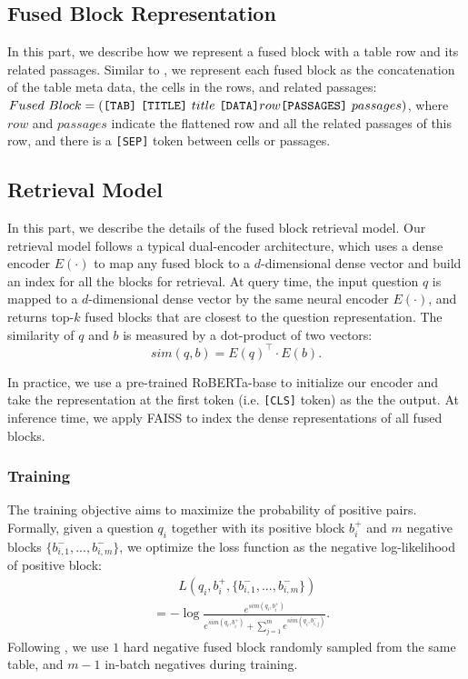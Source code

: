 \documentclass[11pt]{article}
\begin{document}
\subsection{Fused Block Representation}
In this part, we describe how we represent a fused block with a table row and its related passages. Similar to \citet{chen2020open}, we represent each fused block as the concatenation of the table meta data, the cells in the rows, and related passages: 
$Fused\ Block = (\texttt{[TAB]}\ \texttt{[TITLE]}\ title\ 
\texttt{[DATA]}\\ row \texttt{[PASSAGES]}\ passages)$, where $row$ and $passages$ indicate the flattened row and all the related passages of this row, and there is a \texttt{[SEP]} token between cells or passages.
\subsection{Retrieval Model}
In this part, we describe the details of the fused block retrieval model. Our retrieval model follows a typical dual-encoder architecture, which uses a dense encoder $E(\cdot)$ to map any fused block to a $d$-dimensional dense vector and build an index for all the blocks for retrieval.
At query time, the input question $q$ is mapped to a $d$-dimensional dense vector by the same neural encoder $E(\cdot)$, and returns top-$k$ fused blocks that are closest to the question representation.
The similarity of $q$ and $b$ is measured by a dot-product of two vectors:
\begin{equation}
    sim(q, b) =  E(q)^{\top} \cdot E(b).
\end{equation}

In practice, we use a pre-trained RoBERTa-base \cite{Liu2019RoBERTaAR} to initialize our encoder and take the representation at the first token (i.e. \texttt{[CLS]} token) as the the output. At inference time, we apply FAISS \cite{Johnson2021Faiss} to index the dense representations of all fused blocks.
\subsubsection{Training} The training objective aims to maximize the probability of positive pairs. Formally, given a question $q_i$ together with  its positive block $b_i^{+}$ and $m$ negative blocks $\{b_{i,1}^-, ..., b_{i,m}^-\}$, we optimize the loss function as the negative log-likelihood of positive block:
\begin{equation}
\begin{aligned}
    & \qquad L(q_i, b_i^{+}, \{b_{i,1}^-, ..., b_{i,m}^-\}) \\ 
    & = - \log \frac{e^{sim(q_i, b_i^+)}}{ e^{sim(q_i, b_i^+)} + \sum^{m}_{j=1} e^{sim(q_i, b_{i,j}^-)}}.
\end{aligned}
\end{equation}
Following \citet{karpukhin2020dense}, we use $1$ hard negative fused block randomly sampled from the same table, and $m-1$ in-batch negatives during training.
\end{document}
